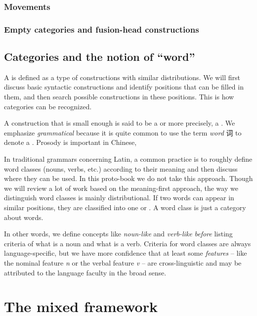 \documentclass[../main.tex]{subfiles}
\begin{document}
\subsubsection{Movements}

\subsubsection{Empty categories and fusion-head constructions}


\subsection{Categories and the notion of ``word''}

A  is defined as a type of constructions with similar distributions.
We will first discuss basic syntactic constructions and identify positions that can be filled in them, 
and then search possible constructions in these positions. This is how categories can be recognized.

A construction that is small enough is said to be a  or more precisely, 
a .
We emphasize \emph{grammatical} because it is quite common to use the term \emph{word} 词 to denote 
a . Prosody is important in Chinese, %

In traditional grammars concerning Latin, a common practice is to roughly define word classes (nouns, verbs, etc.) 
according to their meaning and then discuss where they can be used. 
In this proto-book we do not take this approach. Though we will review a lot of work based on the meaning-first 
approach, the way we distinguish word classes is mainly distributional. If two words can appear in similar
positions, they are classified into one  or .
A word class is just a category about words.  

In other words, we define concepts like \emph{noun-like} and \emph{verb-like} \emph{before} listing criteria of 
what is a noun and what is a verb. Criteria for word classes are always language-specific, but we have more 
confidence that at least some \emph{features} -- like the nominal feature \textit{n} or the verbal feature 
\textit{v} -- are cross-linguistic and may be attributed to the language faculty in the broad sense. 

\section{The mixed framework}
\end{document}
